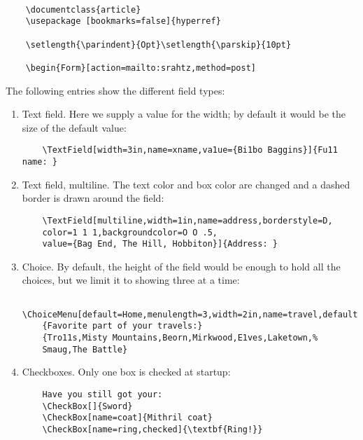\begin{verbatim}

	\documentclass{article} 
	\usepackage [bookmarks=false]{hyperref} 
	
	\setlength{\parindent}{Opt}\setlength{\parskip}{10pt} 
	 
	\begin{Form}[action=mailto:srahtz,method=post] 

\end{verbatim}

The following entries show the different field types: 

\begin{enumerate}

  \item Text field. Here we supply a value for the width; by default it would be the size 
    of the default value: 

    \begin{verbatim}
    \TextField[width=3in,name=xname,va1ue={Bi1bo Baggins}]{Fu11 name: } 
    \end{verbatim}

  \item Text field, multiline. The text color and box color are changed and a dashed 
    border is drawn around the field: 

    \begin{verbatim}
    \TextField[multiline,width=1in,name=address,borderstyle=D, 
    color=1 1 1,backgroundcolor=O O .5, 
    value={Bag End, The Hill, Hobbiton}]{Address: } 
    \end{verbatim}

  \item Choice. By default, the height of the field would be enough to hold all the 
    choices, but we limit it to showing three at a time: 

    \begin{verbatim}
    \ChoiceMenu[default=Home,menulength=3,width=2in,name=travel,default=Beorn] 
    {Favorite part of your travels:} 
    {Tro11s,Misty Mountains,Beorn,Mirkwood,E1ves,Laketown,% 
    Smaug,The Battle} 
    \end{verbatim}

  \item Checkboxes. Only one box is checked at startup: 

    \begin{verbatim}
    Have you still got your: 
    \CheckBox[]{Sword} 
    \CheckBox[name=coat]{Mithril coat} 
    \CheckBox[name=ring,checked]{\textbf{Ring!}} 
    \end{verbatim}


\end{enumerate}
